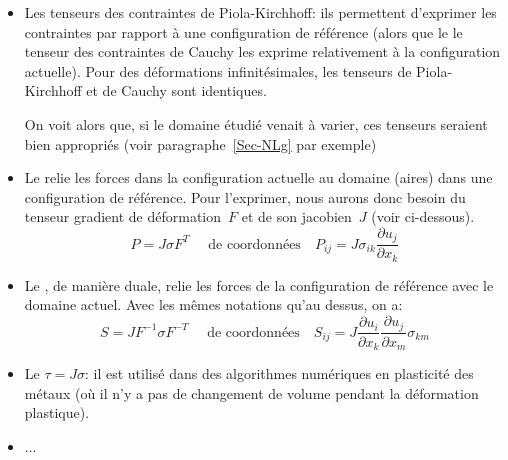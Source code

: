 \begin{itemize}
  \item Les tenseurs des contraintes de Piola-Kirchhoff:
	ils permettent d'exprimer les contraintes par rapport à une configuration de référence
	(alors que le le tenseur des contraintes de Cauchy les exprime relativement à la configuration
	actuelle).
	Pour des déformations infinitésimales, les tenseurs de Piola-Kirchhoff et de Cauchy sont
	identiques.

	On voit alors que, si le domaine étudié venait à varier, ces tenseurs seraient bien
	appropriés (voir paragraphe~\ref{Sec-NLg} par exemple)

  \item Le 
	relie les forces dans la configuration actuelle au domaine (aires) dans une
	configuration de référence.
	Pour l'exprimer, nous aurons donc besoin du tenseur gradient de déformation~$F$ et de son
	jacobien~$J$ (voir ci-dessous).
	\begin{equation}P=J\sigma F^T \quad \text{ de coordonnées} \quad
	P_{ij}= J \sigma_{ik}\frac{\partial u_j}{\partial x_k}\end{equation}

  \item Le ,
	de manière duale, relie les forces de la configuration de référence avec le domaine actuel.
	Avec les mêmes notations qu'au dessus, on a:
	\begin{equation} S=J F^{-1}\sigma F^{-T} \quad \text{ de coordonnées} \quad
	S_{ij} = J \frac{\partial u_i}{\partial x_k}\frac{\partial u_j}{\partial x_m}\sigma_{km}\end{equation}

  \item Le 
	$\tau = J\sigma$: il est utilisé dans des 	algorithmes numériques en plasticité des métaux
	(où il n'y a pas de changement de volume pendant la déformation plastique).

  \item ...
\end{itemize}
